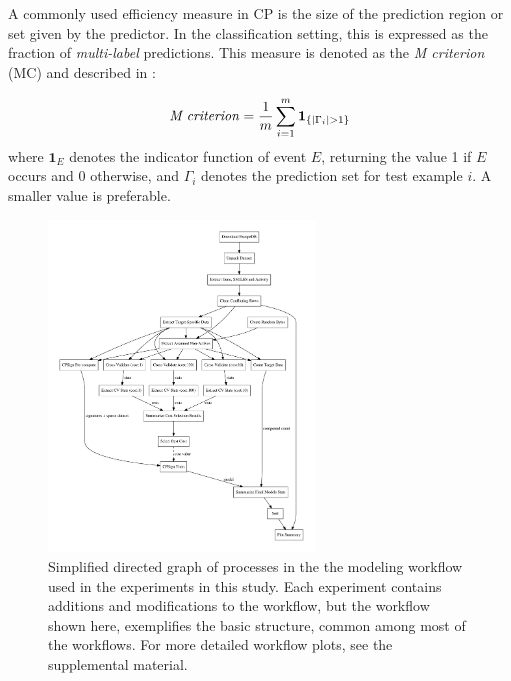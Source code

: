 \documentclass[utf8]{frontiersSCNS} %
\begin{document}
A commonly used efficiency measure in CP is the size of the prediction region or set 
given by the predictor. In the classification setting, this is expressed as the fraction of
\textit{multi-label} predictions. This measure is denoted as the \textit{M criterion} (MC) and described
in \cite{Vovk2016}:

\begin{equation}
\text{\textit{M criterion}} = \frac{ 1}{m} \sum\limits_{i=1}^{m}  \boldsymbol{1}_{\{|\Gamma_i|>1\}}	
\end{equation}
where $\boldsymbol{1}_E$ denotes the indicator function of event $E$, returning the 
value 1 if $E$ occurs and 0 otherwise, and $\Gamma_i$ denotes the prediction set 
for test example $i$.  A smaller value is preferable. 



\begin{figure}[h!]
\begin{center}
\includegraphics[width=0.63\textwidth]{figures/workflow_graph_clean.pdf}
    \caption{Simplified directed graph of processes in the the modeling workflow used
    in the experiments in this study. Each experiment contains additions and modifications
    to the workflow, but the workflow shown here, exemplifies the basic structure,
    common among most of the workflows. For more detailed workflow
    plots, see the supplemental material.}
    \label{fig:workflow_graph_clean}
\end{center}
\end{figure}
\end{document}
